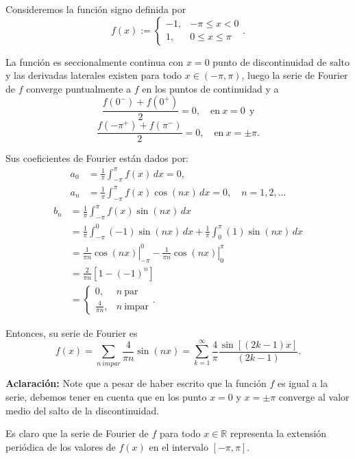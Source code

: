 \begin{ejemplo} \label{Signo}
Consideremos la función signo  definida por
$$f(x) := \left\{ \begin{array}{cc}
     -1,& - \pi \leq x < 0  \\
     1,&   0 \leq x \leq \pi
\end{array} \right. .$$

La función es seccionalmente continua con $x = 0$ punto de discontinuidad de salto y las derivadas laterales existen para todo $x \in (-\pi,\pi)$, luego la serie de Fourier de $f$ converge puntualmente a $f$ en los puntos de continuidad y a 
$$\frac{f(0^-) + f(0^+)}{2} = 0, \quad \mbox{en} ~ x = 0 ~~\mbox{y}$$
$$\frac{f(-\pi^+) + f(\pi^-)}{2} = 0, \quad \mbox{en} ~ x = \pm \pi. $$

Sus coeficientes de Fourier están dados por:
\begin{align*}
    a_0 &= \frac{1}{\pi} \int_{-\pi}^{\pi} f(x) \,dx = 0 , \\
    a_n &= \frac{1}{\pi} \int_{-\pi}^{\pi} f(x) \cos(n x)\,dx = 0, \quad n = 1,2,\dots
\end{align*}
\begin{align*}
     b_n &= \frac{1}{\pi} \int_{-\pi}^{\pi} f(x) \sin(nx) \,dx \\
     &= \frac{1}{\pi} \int_{-\pi}^0 (-1) \sin(nx)\,dx + \frac{1}{\pi} \int_{0}^{\pi} (1) \sin(nx) \,dx \\
     &= \left.  \frac{1}{\pi n} \cos(nx) \right|_{-\pi}^0 - \left. \frac{1}{\pi n} \cos(nx) \right|_{0}^{\pi} \\
     &= \frac{2}{\pi n} [1 - (-1)^n] \\
     &= \left\{ \begin{array}{cl}
         0, & n ~\mbox{par}  \\
         \frac{4}{\pi n}, &  n ~\mbox{impar}
     \end{array} \right. .
\end{align*}

Entonces, su serie de Fourier es 
$$f(x) =  \sum_{n ~impar} \frac{4}{\pi n} \sin(nx) = \sum_{k=1}^{\infty} \frac{4}{\pi} \frac{\sin[(2k-1)x]}{ (2k-1)}.$$

\textbf{Aclaración:} Note que a pesar de haber escrito que la función $f$ es igual a la serie, debemos tener en cuenta que en los punto $x = 0$ y $x = \pm \pi$ converge al valor medio del salto de la discontinuidad.

Es claro que la serie de Fourier de $f$ para todo $x\in \mathbb{R}$ representa la extensión periódica de los valores de $f(x)$ en el intervalo $[-\pi,\pi]$.


\end{ejemplo}
